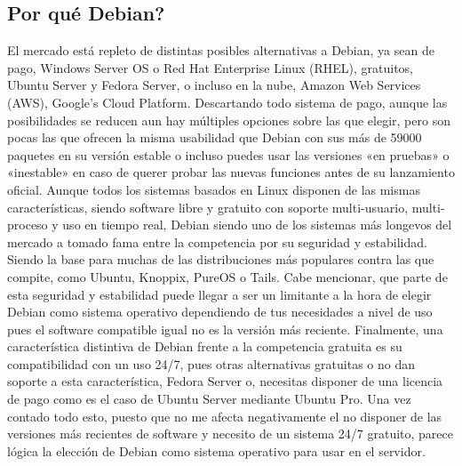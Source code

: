 \subsection{Por qué Debian?}
El mercado está repleto de distintas posibles alternativas a Debian, ya sean de pago, Windows Server OS o Red Hat Enterprise Linux (RHEL), gratuitos, Ubuntu Server y Fedora Server, o incluso en la nube, Amazon Web Services (AWS), Google’s Cloud Platform.
\newline
\newline
Descartando todo sistema de pago, aunque las posibilidades se reducen aun hay múltiples opciones sobre las que elegir, pero son pocas las que ofrecen la misma usabilidad que Debian con sus más de 59000 paquetes en su versión estable o incluso puedes usar las versiones «en pruebas» o «inestable» en caso de querer probar las nuevas funciones antes de su lanzamiento oficial. \cite{DebWhy}
\newline
\newline
Aunque todos los sistemas basados en Linux disponen de las mismas características, siendo software libre y gratuito con soporte multi-usuario, multi-proceso y uso en tiempo real, Debian siendo uno de los sistemas más longevos del mercado a tomado fama entre la competencia por su seguridad y estabilidad. Siendo la base para muchas de las distribuciones más populares contra las que compite, como Ubuntu, Knoppix, PureOS o Tails.
\newline
\newline
Cabe mencionar, que parte de esta seguridad y estabilidad puede llegar a ser un limitante a la hora de elegir Debian como sistema operativo dependiendo de tus necesidades a nivel de uso pues el software compatible igual no es la versión más reciente.
\newline
\newline
Finalmente, una característica distintiva de Debian frente a la competencia gratuita es su compatibilidad con un uso 24/7, pues otras alternativas gratuitas o no dan soporte a esta característica, Fedora Server o, necesitas disponer de una licencia de pago como es el caso de Ubuntu Server mediante Ubuntu Pro.
\newline
\newline
Una vez contado todo esto, puesto que no me afecta negativamente el no disponer de las versiones más recientes de software y necesito de un sistema 24/7 gratuito, parece lógica la elección de Debian como sistema operativo para usar en el servidor.

